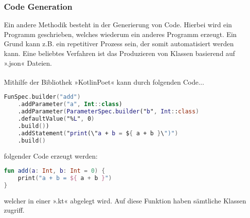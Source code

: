 \subsubsection{Code Generation}
Ein andere Methodik besteht in der Generierung von Code. Hierbei wird ein Programm geschrieben, welches wiederum ein anderes Programm erzeugt. Ein Grund kann z.B. ein repetitiver Prozess sein, der somit automatisiert werden kann. Eine beliebtes Verfahren ist das Produzieren von Klassen basierend auf ».json« Dateien.
\\
\\
Mithilfe der Bibliothek »KotlinPoet« kann durch folgenden Code...
\begin{lstlisting}[caption={Code zum erezugen einer Funktion}, label={lst:data-class}, language=Kotlin]
FunSpec.builder("add")
	.addParameter("a", Int::class)
	.addParameter(ParameterSpec.builder("b", Int::class)
	.defaultValue("%L", 0)
	.build())
	.addStatement("print(\"a + b = ${ a + b }\")")
	.build()
\end{lstlisting}
\bigskip
folgender Code erzeugt werden:
\begin{lstlisting}[caption={Erzeugte Funktionen}, label={lst:data-class}, language=Kotlin]
fun add(a: Int, b: Int = 0) {
	print("a + b = ${ a + b }")
}
\end{lstlisting}
welcher in einer ».kt« abgelegt wird. Auf diese Funktion haben sämtliche Klassen zugriff.

